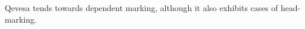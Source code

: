 \documentclass[grammar]{subfiles}
\begin{document}
  Qevesa tends towards dependent marking, although it also exhibits cases of head-marking.

  \ToBeWritten













\end{document}
